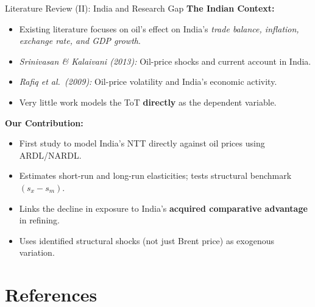 \documentclass[10pt,aspectratio=169]{beamer}
\begin{document}
\begin{frame}{Literature Review (II): India and Research Gap}
  \textbf{The Indian Context:}
  \begin{itemize}
    \item Existing literature focuses on oil's effect on India's \textit{trade balance, inflation, exchange rate, and GDP growth}.
    \item \textit{Srinivasan \& Kalaivani (2013):} Oil-price shocks and current account in India.
    \item \textit{Rafiq et al.\ (2009):} Oil-price volatility and India's economic activity.
    \item Very little work models the ToT \textbf{directly} as the dependent variable.
  \end{itemize}
  \vspace{0.3cm}
  \textbf{Our Contribution:}
  \begin{itemize}
    \item First study to model India's NTT directly against oil prices using ARDL/NARDL.
    \item Estimates short-run and long-run elasticities; tests structural benchmark $(s_x - s_m)$.
    \item Links the decline in exposure to India's \textbf{acquired comparative advantage} in refining.
    \item Uses identified structural shocks (not just Brent price) as exogenous variation.
  \end{itemize}
\end{frame}

\section{References}
\end{document}
